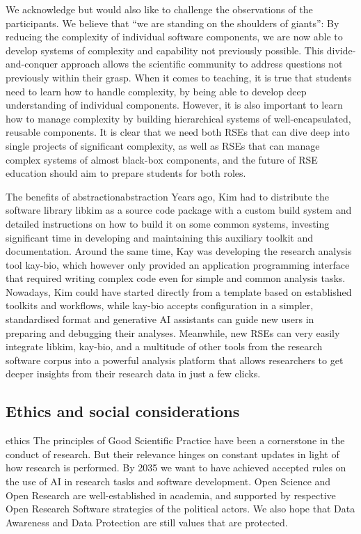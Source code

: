 \documentclass{eceasst}
\begin{document}
We acknowledge but would also like to challenge the observations of the participants.
We believe that ``we are standing on the shoulders of giants'':
By reducing the complexity of individual software components,
we are now able to develop systems of complexity and capability not previously possible.
This divide-and-conquer approach allows the scientific community to address questions not previously within their grasp.
When it comes to teaching, it is true that students need to learn how to handle complexity,
by being able to develop deep understanding of individual components.
However, it is also important to learn how to manage complexity
by building hierarchical systems of well-encapsulated, reusable components.
It is clear that we need both RSEs that can dive deep into single projects of significant complexity,
as well as RSEs that can manage complex systems of almost black-box components,
and the future of RSE education should aim to prepare students for both roles.

\begin{story}{The benefits of abstraction}{abstraction}
Years ago, Kim had to distribute the software library libkim as a source code package with a custom build system and detailed instructions on how to build it on some common systems,
investing significant time in developing and maintaining this auxiliary toolkit and documentation.
Around the same time, Kay was developing the research analysis tool kay-bio,
which however only provided an application programming interface that
required writing complex code even for simple and common analysis tasks.
Nowadays, Kim could have started directly from a template based on established toolkits and workflows,
while kay-bio accepts configuration in a simpler, standardised format and generative AI assistants
can guide new users in preparing and debugging their analyses.
Meanwhile, new RSEs can very easily integrate libkim, kay-bio, and a multitude
of other tools from the research software corpus into a powerful analysis
platform that allows researchers to get deeper insights from their research data
in just a few clicks.
\end{story}

\subsection{Ethics and social considerations}
\begin{whatis}{}{ethics}
The principles of Good Scientific Practice \cite{dfg_gsp} have been a cornerstone in the conduct of research.
But their relevance hinges on constant updates in light of how research is performed.
By 2035 we want to have achieved accepted rules on the use of AI in research tasks and software development.
Open Science and Open Research are well-established in academia, and supported by respective Open Research Software
strategies of the political actors. We also hope that Data Awareness and Data Protection are still values
that are protected.
\end{whatis}
\end{document}
